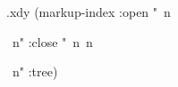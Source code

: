  
 

  
\begin{filecontents*}{\PROJ.xdy}
(markup-index :open  "~n
\begin{theindex}
  \providecommand*\lettergroupDefault[1]{}
  \providecommand*\lettergroup[1]{%
    \textsf{#1}
    \nopagebreak
  }
  ~n"
  :close "~n~n\end{theindex}~n"
:tree)
\end{filecontents*}

